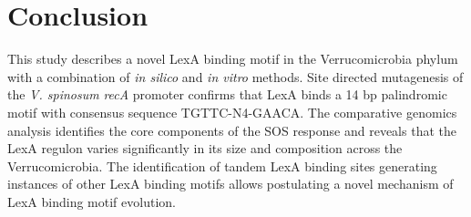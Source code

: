 \section{Conclusion}
This study describes a novel LexA binding motif in the Verrucomicrobia phylum
with a combination of \textit{in silico} and \textit{in vitro} methods. Site
directed mutagenesis of the \textit{V. spinosum} \textit{recA} promoter
confirms that LexA binds a 14 bp palindromic motif with consensus sequence
TGTTC-N4-GAACA. The comparative genomics analysis identifies the core
components of the SOS response and reveals that the LexA regulon varies
significantly in its size and composition across the Verrucomicrobia. The
identification of tandem LexA binding sites generating instances of other LexA
binding motifs allows postulating a novel mechanism of LexA binding motif
evolution.
